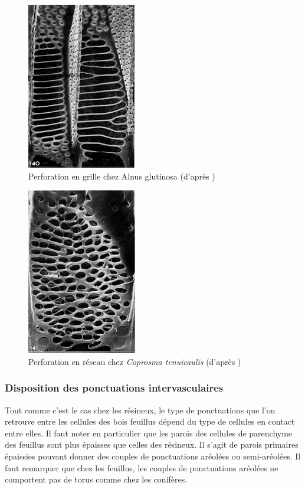 \begin{figure}[h]
\centering
\includegraphics[scale=1]{img/ch4_grille}
\caption{Perforation en grille chez Alnus glutinosa (d'après \cite{butterfield2012three})}
\label{fig:grille}
\end{figure}

\begin{figure}[h]
\centering
\includegraphics[scale=1]{img/ch4_reseau}
\caption{Perforation en réseau chez \textit{Coprosma tenuicaulis} (d'après \cite{butterfield2012three})}
\label{fig:reseau}
\end{figure}

\subsubsection{Disposition des ponctuations intervasculaires}\label{disposition}

Tout comme c'est le cas chez les résineux, le type de ponctuations que l'on retrouve entre les cellules des bois feuillus dépend du type de cellules en contact entre elles.  Il faut noter en particulier que les parois des cellules de parenchyme des feuillus sont plus épaisses que celles des résineux. Il s'agit de parois primaires \og épaissies \fg pouvant donner des couples de ponctuations aréolées ou semi-aréolées. Il faut remarquer que chez les feuillus, les couples de ponctuations aréolées ne comportent pas de torus comme chez les conifères.\\

